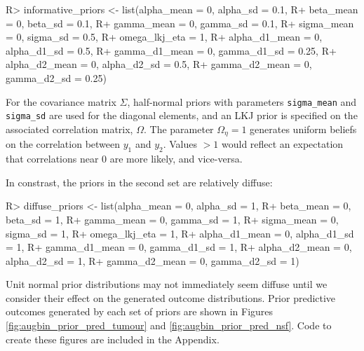 \documentclass[article]{jss}
\begin{document}
\begin{CodeChunk}

\begin{CodeInput}
R> informative_priors <- list(alpha_mean = 0, alpha_sd = 0.1,
R+                            beta_mean = 0, beta_sd = 0.1,
R+                            gamma_mean = 0, gamma_sd = 0.1,
R+                            sigma_mean = 0, sigma_sd = 0.5,
R+                            omega_lkj_eta = 1,
R+                            alpha_d1_mean = 0, alpha_d1_sd = 0.5,
R+                            gamma_d1_mean = 0, gamma_d1_sd = 0.25,
R+                            alpha_d2_mean = 0, alpha_d2_sd = 0.5,
R+                            gamma_d2_mean = 0, gamma_d2_sd = 0.25)
\end{CodeInput}
\end{CodeChunk}

For the covariance matrix \(\Sigma\), half-normal priors with parameters
\texttt{sigma\_mean} and \texttt{sigma\_sd} are used for the diagonal
elements, and an LKJ prior is specified on the associated correlation
matrix, \(\Omega\). The parameter \(\Omega_\eta = 1\) generates uniform
beliefs on the correlation between \(y_1\) and \(y_2\). Values \(> 1\)
would reflect an expectation that correlations near 0 are more likely,
and vice-versa.

In constrast, the priors in the second set are relatively diffuse:

\begin{CodeChunk}

\begin{CodeInput}
R> diffuse_priors <- list(alpha_mean = 0, alpha_sd = 1,
R+                        beta_mean = 0, beta_sd = 1,
R+                        gamma_mean = 0, gamma_sd = 1,
R+                        sigma_mean = 0, sigma_sd = 1,
R+                        omega_lkj_eta = 1,
R+                        alpha_d1_mean = 0, alpha_d1_sd = 1,
R+                        gamma_d1_mean = 0, gamma_d1_sd = 1,
R+                        alpha_d2_mean = 0, alpha_d2_sd = 1,
R+                        gamma_d2_mean = 0, gamma_d2_sd = 1)
\end{CodeInput}
\end{CodeChunk}

Unit normal prior distributions may not immediately seem diffuse until
we consider their effect on the generated outcome distributions. Prior
predictive outcomes generated by each set of priors are shown in Figures
\ref{fig:augbin_prior_pred_tumour} and \ref{fig:augbin_prior_pred_nsf}.
Code to create these figures are included in the Appendix.
\end{document}
